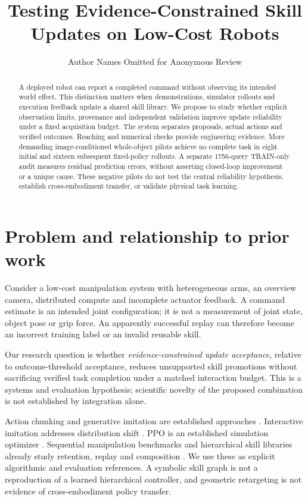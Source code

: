 \documentclass[conference]{IEEEtran}
\begin{document}
\title{Testing Evidence-Constrained Skill Updates on Low-Cost Robots}
\author{Author Names Omitted for Anonymous Review}
\maketitle
\begin{abstract}
A deployed robot can report a completed command without observing its intended world effect. This distinction matters when demonstrations, simulator rollouts and execution feedback update a shared skill library. We propose to study whether explicit observation limits, provenance and independent validation improve update reliability under a fixed acquisition budget. The system separates proposals, actual actions and verified outcomes. Reaching and numerical checks provide engineering evidence. More demanding image-conditioned whole-object pilots achieve no complete task in eight initial and sixteen subsequent fixed-policy rollouts. A separate 1756-query TRAIN-only audit measures residual prediction errors, without asserting closed-loop improvement or a unique cause. These negative pilots do not test the central reliability hypothesis, establish cross-embodiment transfer, or validate physical task learning.
\end{abstract}
\IEEEpeerreviewmaketitle

\section{Problem and relationship to prior work}
Consider a low-cost manipulation system with heterogeneous arms, an overview camera, distributed compute and incomplete actuator feedback. A command estimate is an intended joint configuration; it is not a measurement of joint state, object pose or grip force. An apparently successful replay can therefore become an incorrect training label or an invalid reusable skill.

Our research question is whether \emph{evidence-constrained update acceptance}, relative to outcome-threshold acceptance, reduces unsupported skill promotions without sacrificing verified task completion under a matched interaction budget. This is a systems and evaluation hypothesis; scientific novelty of the proposed combination is not established by integration alone.

Action chunking and generative imitation are established approaches \citep{act,diffusion}. Interactive imitation addresses distribution shift \citep{dagger}. PPO is an established simulation optimizer \citep{ppo}. Sequential manipulation benchmarks and hierarchical skill libraries already study retention, replay and composition \citep{libero,lotus}. We use these as explicit algorithmic and evaluation references. A symbolic skill graph is not a reproduction of a learned hierarchical controller, and geometric retargeting is not evidence of cross-embodiment policy transfer.
\end{document}
